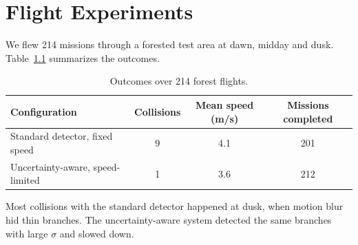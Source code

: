 \chapter{Flight Experiments}
\label{ch:flights}

We flew 214 missions through a forested test area at dawn, midday and dusk.
Table~\ref{tab:flights} summarizes the outcomes.

\begin{table}[htbp]
  \centering
  \caption{Outcomes over 214 forest flights.}
  \label{tab:flights}
  \begin{tabular}{lccc}
    \toprule
    Configuration & Collisions & Mean speed (m/s) & Missions completed \\
    \midrule
    Standard detector, fixed speed      & 9 & 4.1 & 201 \\
    Uncertainty-aware, speed-limited    & 1 & 3.6 & 212 \\
    \bottomrule
  \end{tabular}
\end{table}

Most collisions with the standard detector happened at dusk, when motion blur hid thin branches.
The uncertainty-aware system detected the same branches with large $\sigma$ and slowed down.

